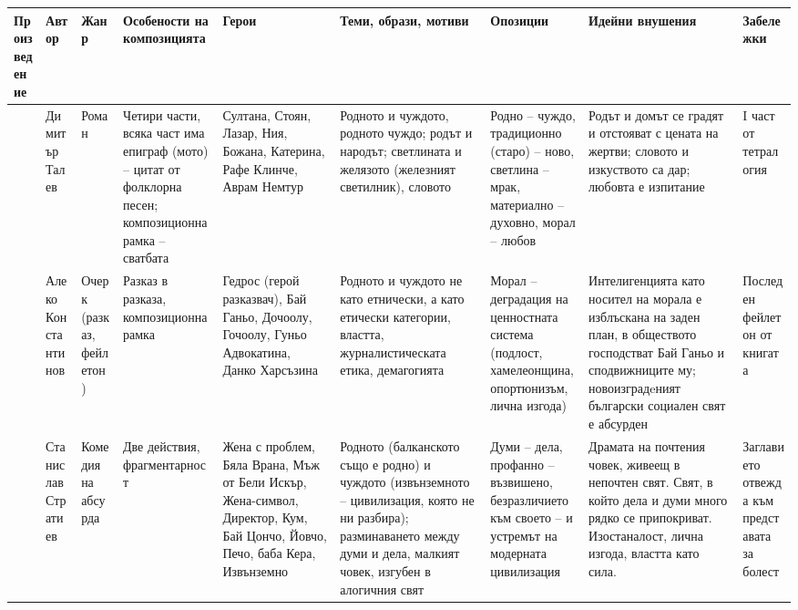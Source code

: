 \documentclass[12pt,a4paper]{article}
\begin{document}
\begin{tabular}{|L{1.4cm}|L{1.4cm}|L{1.4cm}|L{2.1cm}|L{2.3cm}|L{2.6cm}|L{2.1cm}|L{3.0cm}|L{1.3cm}|}
\hline
\textbf{Произ\-веде\-ние} &
\textbf{Автор} &
\textbf{Жанр} &
\textbf{Особе\-ности на композицията} &
\textbf{Герои} &
\textbf{Теми, образи, мотиви} &
\textbf{Опозиции} &
\textbf{Идейни внушения} &
\textbf{Забе\-лежки} \\
\hline

 &
Димитър Талев &
Роман &
Четири части, всяка част има епиграф (мото) -- цитат от фолклорна песен; композиционна рамка -- сватбата &
Султана, Стоян, Лазар, Ния, Божана, Катерина, Рафе Клинче, Аврам Немтур &
Родното и чуждото, родното чуждо; родът и народът; светлината и желязото (железният светилник), словото &
Родно -- чуждо, традиционно (старо) -- ново, светлина -- мрак, материално -- духовно, морал -- любов &
Родът и домът се градят и отстояват с цената на жертви; словото и изкуството са дар; любовта е изпитание &
I част от тетралогия \\
\hline

 &
Алеко Константинов &
Очерк (разказ, фейлетон) &
Разказ в разказа, композиционна рамка &
Гедрос (герой разказвач), Бай Ганьо, Дочоолу, Гочоолу, Гуньо Адвокатина, Данко Харсъзина &
Родното и чуждото не като етнически, а като етически категории, властта, журналистическата етика, демагогията &
Морал -- деградация на ценностната система (подлост, хамелеонщина, опортюнизъм, лична изгода) &
Интелигенцията като носител на морала е изблъскана на заден план, в обществото господстват Бай Ганьо и сподвижниците му; новоизградeният български социален свят е абсурден &
Последен фейлетон от книгата  \\
\hline

 &
Станислав Стратиев &
Комедия на абсурда &
Две действия, фрагментарност &
Жена с проблем, Бяла Врана, Мъж от Бели Искър, Жена-символ, Директор, Кум, Бай Цончо, Йовчо, Печо, баба Кера, Извънземно &
Родното (балканското също е родно) и чуждото (извънземното -- цивилизация, която не ни разбира); разминаването между думи и дела, малкият човек, изгубен в алогичния свят &
Думи -- дела, профанно -- възвишено, безразличието към своето -- и устремът на модерната цивилизация &
Драмата на почтения човек, живеещ в непочтен свят. Свят, в който дела и думи много рядко се припокриват. Изостаналост, лична изгода, властта като сила. &
Заглавието отвежда към представата за болест \\
\hline
\end{tabular}
\normalsize
\newpage
\end{document}
